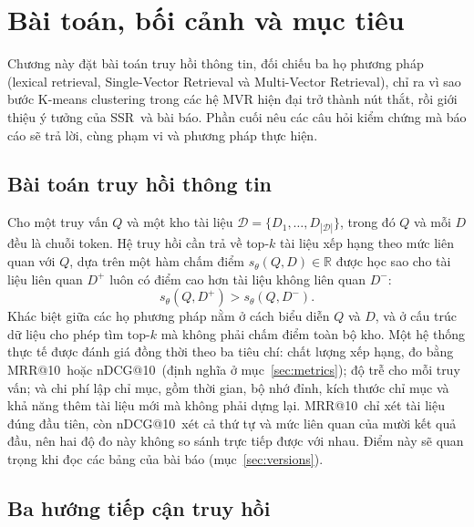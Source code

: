 \documentclass[a4paper,13pt]{extreport}
\makeatletter
\theoremstyle{plain}
\newcommand{\ssr}{SSR}
\newcommand{\ndcg}{nDCG@10}
\newcommand{\mrr}{MRR@10}
\newcommand{\Rb}{\mathbb{R}}
\makeatother
\begin{document}
\clearpage
{}
\chapter{Bài toán, bối cảnh và mục tiêu}
\label{ch:intro}

Chương này đặt bài toán truy hồi thông tin, đối chiếu ba họ phương pháp (lexical retrieval, Single-Vector Retrieval và Multi-Vector Retrieval), chỉ ra vì sao bước K-means clustering trong các hệ MVR hiện đại trở thành nút thắt, rồi giới thiệu ý tưởng của \ssr\ và bài báo. Phần cuối nêu các câu hỏi kiểm chứng mà báo cáo sẽ trả lời, cùng phạm vi và phương pháp thực hiện.

\section{Bài toán truy hồi thông tin}
\label{sec:problem}
Cho một truy vấn $Q$ và một kho tài liệu $\mathcal{D}=\{D_1,\dots,D_{|\mathcal{D}|}\}$, trong đó $Q$ và mỗi $D$ đều là chuỗi token. Hệ truy hồi cần trả về top-$k$ tài liệu xếp hạng theo mức liên quan với $Q$, dựa trên một hàm chấm điểm $s_\theta(Q,D)\in\Rb$ được học sao cho tài liệu liên quan $D^+$ luôn có điểm cao hơn tài liệu không liên quan $D^-$:
\begin{equation}
s_\theta(Q,D^+)>s_\theta(Q,D^-).
\label{eq:rank}
\end{equation}
Khác biệt giữa các họ phương pháp nằm ở cách biểu diễn $Q$ và $D$, và ở cấu trúc dữ liệu cho phép tìm top-$k$ mà không phải chấm điểm toàn bộ kho. Một hệ thống thực tế được đánh giá đồng thời theo ba tiêu chí: chất lượng xếp hạng, đo bằng \mrr\ hoặc \ndcg\ (định nghĩa ở mục~\ref{sec:metrics}); độ trễ cho mỗi truy vấn; và chi phí lập chỉ mục, gồm thời gian, bộ nhớ đỉnh, kích thước chỉ mục và khả năng thêm tài liệu mới mà không phải dựng lại. \mrr\ chỉ xét tài liệu đúng đầu tiên, còn \ndcg\ xét cả thứ tự và mức liên quan của mười kết quả đầu, nên hai độ đo này không so sánh trực tiếp được với nhau. Điểm này sẽ quan trọng khi đọc các bảng của bài báo (mục~\ref{sec:versions}).

\section{Ba hướng tiếp cận truy hồi}
\end{document}
